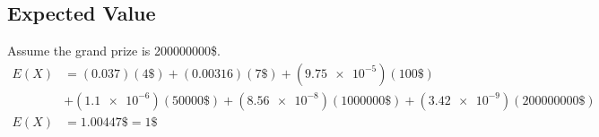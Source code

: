 \documentclass{article}
\begin{document}
\subsection{Expected Value}

Assume the grand prize is 200000000\$.
\begin{align*}
	E(X) & = (0.037)(4\$) + (0.00316)(7\$) + (\num{9.75e-5})(100\$)                              \\
	     & + (\num{1.1e-6})(50000\$) + (\num{8.56e-8})(1000000\$) + (\num{3.42e-9})(200000000\$) \\
	E(X) & = 1.00447\$ = 1\$
\end{align*}
\end{document}
